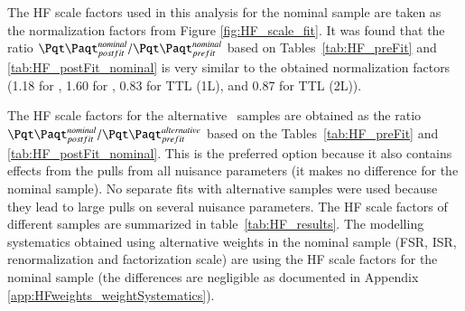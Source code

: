 The HF scale factors used in this analysis for the nominal \ttbar sample are taken as the normalization factors from Figure \ref{fig:HF_scale_fit}. It was found that the ratio $\ttbar_{postfit}^{nominal} / \ttbar_{prefit}^{nominal}$ based on Tables~\ref{tab:HF_preFit} and \ref{tab:HF_postFit_nominal} is very similar to the obtained normalization factors (1.18 for \ttbin, 1.60 for \ttcin, 0.83 for TTL (1L), and  0.87 for TTL (2L)).

The HF scale factors for the alternative \ttbar\ samples are obtained as the ratio $\ttbar_{postfit}^{nominal} / \ttbar_{prefit}^{alternative}$ based on the Tables~\ref{tab:HF_preFit} and \ref{tab:HF_postFit_nominal}. This is the preferred option because it also contains effects from the pulls from all nuisance parameters (it makes no difference for the nominal sample). No separate fits with alternative samples were used because they lead to large pulls on several nuisance parameters.  The HF scale factors of different \ttbar samples are summarized in table~\ref{tab:HF_results}. The \ttbar modelling systematics obtained using alternative weights in the nominal \ttbar sample (FSR, ISR, renormalization and factorization scale) are using the HF scale factors for the nominal \ttbar sample (the differences are negligible as documented in Appendix \ref{app:HFweights_weightSystematics}).


